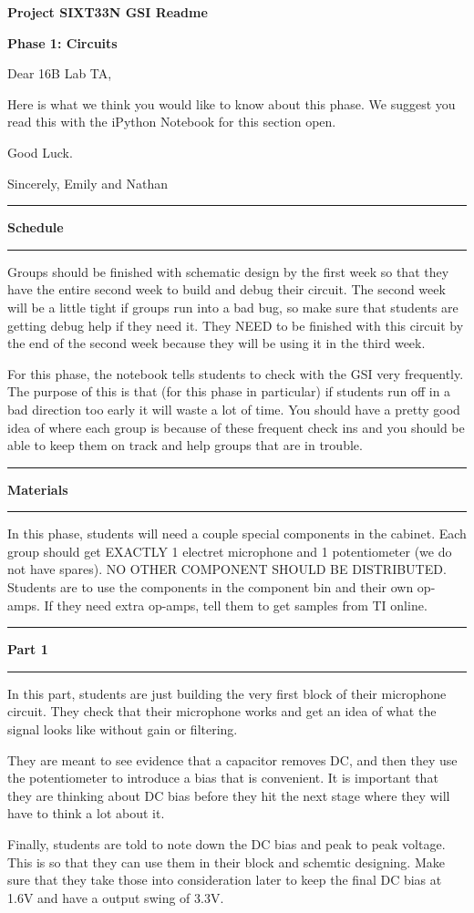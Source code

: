 \documentclass[11pt]{article}
\newcommand\header[1]{\vspace{.25in}\hrule\textbf{#1}\vspace{.5em}\hrule\vspace{.10in}}
\begin{document}
\raggedright
\newcommand\NAME{Emily Naviasky}  %
\newcommand\PHASE{Phase 1: Circuits}

\LARGE \textbf{Project SIXT33N GSI Readme}

\Large \textbf{\PHASE}
\normalsize

Dear 16B Lab TA,

Here is what we think you would like to know about this phase. We suggest you read this with the iPython Notebook for this section open. 

Good Luck.

Sincerely,
Emily and Nathan

\header{Schedule}
Groups should be finished with schematic design by the first week so that they have the entire second week to build and debug their circuit. The second week will be a little tight if groups run into a bad bug, so make sure that students are getting debug help if they need it. They NEED to be finished with this circuit by the end of the second week because they will be using it in the third week. 

For this phase, the notebook tells students to check with the GSI very frequently. The purpose of this is that (for this phase in particular) if students run off in a bad direction too early it will waste a lot of time. You should have a pretty good idea of where each group is because of these frequent check ins and you should be able to keep them on track and help groups that are in trouble.


\header{Materials}
In this phase, students will need a couple special components in the cabinet. Each group should get EXACTLY 1 electret microphone and 1 potentiometer (we do not have spares). NO OTHER COMPONENT SHOULD BE DISTRIBUTED. Students are to use the components in the component bin and their own op-amps. If they need extra op-amps, tell them to get samples from TI online.

\header{Part 1}
In this part, students are just building the very first block of their microphone circuit. They check that their microphone works and get an idea of what the signal looks like without gain or filtering. 

They are meant to see evidence that a capacitor removes DC, and then they use the potentiometer to introduce a bias that is convenient. It is important that they are thinking about DC bias before they hit the next stage where they will have to think a lot about it.

Finally, students are told to note down the DC bias and peak to peak voltage. This is so that they can use them in their block and schemtic designing. Make sure that they take those into consideration later to keep the final DC bias at 1.6V and have a output swing of 3.3V.
\end{document}
